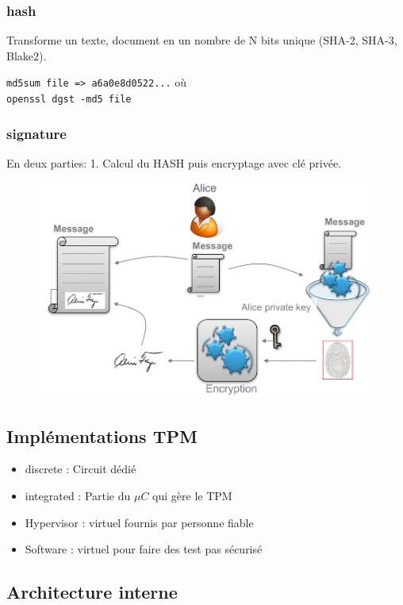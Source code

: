 \documentclass[resume]{subfiles}
\begin{document}
\subsubsection{hash}

Transforme un texte, document en un nombre de N bits unique (SHA-2, SHA-3, Blake2).

\verb!md5sum file => a6a0e8d0522...! 
où\\
\verb!openssl dgst -md5 file!  

\subsubsection{signature}
\label{sec_sign}
En deux parties: 1. Calcul du HASH puis encryptage avec clé privée. 
\begin{figure}[H]
    \centering
    \includegraphics[width=0.8\columnwidth]{Figures/TPM/signature.png}
\end{figure}

\subsection{Implémentations TPM}
\begin{itemize}
\item discrete : Circuit dédié 
\item integrated : Partie du $\mu C$ qui gère le TPM
\item Hypervisor : virtuel fournis par personne fiable
\item Software : virtuel pour faire des test pas sécurisé
\end{itemize}

\subsection{Architecture interne}
\end{document}
